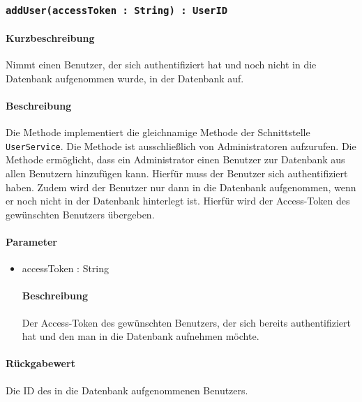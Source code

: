 \subsubsection{\texttt{addUser(accessToken : String) : UserID}}%
\paragraph*{Kurzbeschreibung}
Nimmt einen Benutzer, der sich authentifiziert hat und noch nicht in die Datenbank aufgenommen wurde, in der Datenbank auf.
\paragraph*{Beschreibung}
Die Methode implementiert die gleichnamige Methode der Schnittstelle \texttt{UserService}.
Die Methode ist ausschließlich von Administratoren aufzurufen.
Die Methode ermöglicht, dass ein Administrator einen Benutzer zur Datenbank aus allen Benutzern hinzufügen kann. Hierfür muss der Benutzer sich authentifiziert haben. 
Zudem wird der Benutzer nur dann in die Datenbank aufgenommen, wenn er noch nicht in der Datenbank hinterlegt ist.
Hierfür wird der Access-Token des gewünschten Benutzers übergeben.
\paragraph*{Parameter}
\begin{itemize}
    \item accessToken : String
    		\paragraph*{Beschreibung}
    		Der Access-Token des gewünschten Benutzers, der sich bereits authentifiziert hat und den man in die Datenbank aufnehmen möchte.
\end{itemize}
\paragraph*{Rückgabewert}
Die ID des in die Datenbank aufgenommenen Benutzers.
